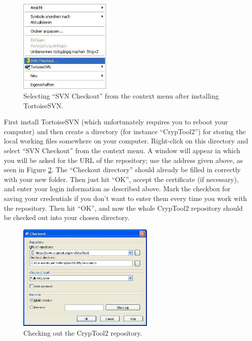 \begin{figure}[h!]
	\centering
		\includegraphics[width=0.40\textwidth]{figures/tortoise_svn_checkout.jpg}
	\caption{Selecting ``SVN Checkout'' from the context menu after installing TortoiseSVN.}
	\label{fig:tortoise_svn_checkout}
\end{figure}

First install TortoiseSVN (which unfortunately requires you to reboot your computer) and then create a directory (for instance ``CrypTool2'') for storing the local working files somewhere on your computer. Right-click on this directory and select ``SVN Checkout'' from the context menu. A window will appear in which you will be asked for the URL of the repository; use the address given above, as seen in Figure \ref{fig:tortoise_svn_checkout2}. The ``Checkout directory'' should already be filled in correctly with your new folder. Then just hit ``OK'', accept the certificate (if necessary), and enter your login information as described above. Mark the checkbox for saving your credentials if you don't want to enter them every time you work with the repository. Then hit ``OK'', and now the whole CrypTool2 repository should be checked out into your chosen directory.
\clearpage

\begin{figure}[h!]
	\centering
		\includegraphics[width=0.60\textwidth]{figures/tortoise_svn_checkout2.jpg}
	\caption{Checking out the CrypTool2 repository.}
	\label{fig:tortoise_svn_checkout2}
\end{figure}

